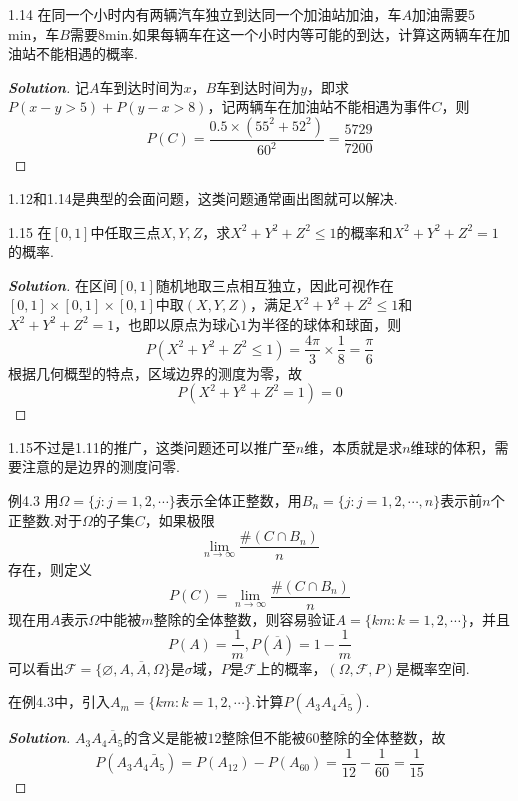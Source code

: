 \documentclass[10pt, a4paper, oneside]{ctexart}
\newenvironment{solution}{\begin{proof}[\bf Solution]}{\end{proof}}
\begin{document}
1.14 在同一个小时内有两辆汽车独立到达同一个加油站加油，车$A$加油需要$5$min，车$B$需要$8$min.如果每辆车在这一个小时内等可能的到达，计算这两辆车在加油站不能相遇的概率.
\begin{solution}
记$A$车到达时间为$x$，$B$车到达时间为$y$，即求$P(x-y>5)+P(y-x>8)$，记两辆车在加油站不能相遇为事件$C$，则
\[P(C) = \frac{{0.5 \times ({{55}^2} + {{52}^2})}}{{{{60}^2}}} = \frac{{5729}}{{7200}}\]
\end{solution}
\begin{remark}
1.12和1.14是典型的会面问题，这类问题通常画出图就可以解决.
\end{remark}

1.15 在$[0,1]$中任取三点$X,Y,Z$，求$X^2+Y^2+Z^2\leqslant 1$的概率和$X^2+Y^2+Z^2=1$的概率.
\begin{solution}
  在区间$[0,1]$随机地取三点相互独立，因此可视作在$[0,1]\times [0,1]\times [0,1]$中取$(X,Y,Z)$，满足$X^2+Y^2+Z^2\leqslant 1$和$X^2+Y^2+Z^2=1$，也即以原点为球心$1$为半径的球体和球面，则
\[
P(X^2+Y^2+Z^2\leqslant 1)=\frac{4\pi}{3}\times\frac{1}{8}=\frac{\pi}{6}
\]
根据几何概型的特点，区域边界的测度为零，故
\[
P(X^2+Y^2+Z^2=1)=0
\]  
\end{solution}
\begin{remark}
1.15不过是1.11的推广，这类问题还可以推广至$n$维，本质就是求$n$维球的体积，需要注意的是边界的测度问零.
\end{remark}

例4.3 用$\Omega=\{j:j=1,2,\cdots\}$表示全体正整数，用$B_n=\{j:j=1,2,\cdots,n\}$表示前$n$个正整数.对于$\Omega$的子集$C$，如果极限
\[\mathop {\lim }\limits_{n \to \infty } \frac{{\# (C \cap {B_n})}}{n}\]
存在，则定义
\[P(C) = \mathop {\lim }\limits_{n \to \infty } \frac{{\# (C \cap {B_n})}}{n}\]
现在用$A$表示$\Omega$中能被$m$整除的全体整数，则容易验证$A=\{km:k=1,2,\cdots\}$，并且
\[P(A) = \frac{1}{m},P(\overline A ) = 1 - \frac{1}{m}\]
可以看出$\mathscr{F}=\{\varnothing,A,\overline{A},\Omega\}$是$\sigma$域，$P$是$\mathscr{F}$上的概率，$(\Omega,\mathscr{F},P)$是概率空间.

 在例$4.3$中，引入$A_m=\{km:k=1,2,\cdots\}$.计算$P(A_3A_4\overline{A}_5)$.
\begin{solution}
$A_3A_4\overline{A}_5$的含义是能被$12$整除但不能被$60$整除的全体整数，故
\[P({A_3}{A_4}{{\bar A}_5}) = P({A_{12}}) - P({A_{60}}) = \frac{1}{{12}} - \frac{1}{{60}} = \frac{1}{{15}}\]
\end{solution}
\end{document}

